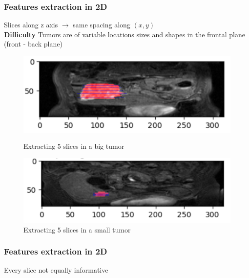 \documentclass{beamer}
\begin{document}
\begin{frame}
    \frametitle{Features extraction in 2D}
    \vspace{5 pt}
    Slices along z axis $\rightarrow$ same spacing along $(x,y)$\\[5 pt]
    \textbf{Difficulty} Tumors are of variable locations sizes and shapes in the frontal plane (front - back plane)
    \begin{figure}
        \begin{minipage}{0.45\textwidth}
            \centering
            \includegraphics[scale = 0.125]{images/slices_big.png}
            \caption{Extracting 5 slices in a big tumor}
        \end{minipage}
        \hspace{0.03\textwidth} 
        \begin{minipage}{0.45\textwidth}
            \centering
            \includegraphics[scale = 0.18]{images/slices_small.png}
            \caption{Extracting 5 slices in a small tumor}
        \end{minipage}
    \end{figure}
\end{frame}

\begin{frame}
    \frametitle{Features extraction in 2D}
    Every slice not equally informative
\end{frame}
\end{document}
